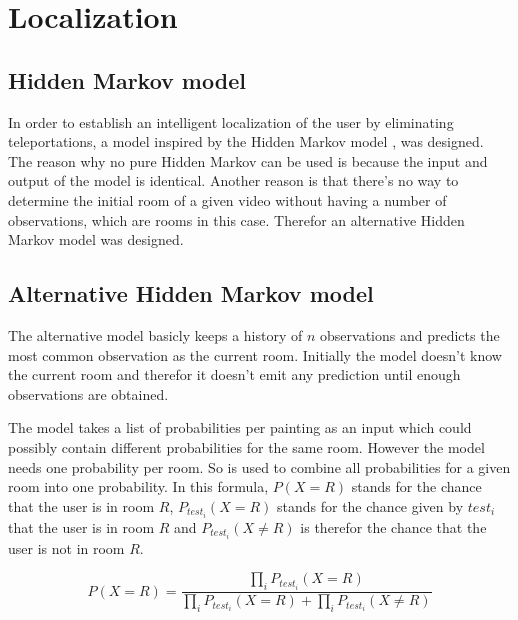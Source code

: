 \section{Localization}
\label{sec:localization}

\subsection{Hidden Markov model}
\label{subsec:hidden-markov}

In order to establish an intelligent localization of the user by eliminating teleportations, a model inspired by the Hidden Markov model \cite{eddy1996hidden}, was designed. The reason why no pure Hidden Markov can be used is because the input and output of the model is identical. Another reason is that there's no way to determine the initial room of a given video without having a number of observations, which are rooms in this case. Therefor an alternative Hidden Markov model was designed.


\subsection{Alternative Hidden Markov model}
\label{subsec:alternative-hidden-markov}

The alternative model basicly keeps a history of $n$ observations and predicts the most common observation as the current room. Initially the model doesn't know the current room and therefor it doesn't emit any prediction until enough observations are obtained.

The model takes a list of probabilities per painting as an input which could possibly contain different probabilities for the same room. However the model needs one probability per room. So  \cite{genest1986combining} is used to combine all probabilities for a given room into one probability. In this formula, $P(X = R)$ stands for the chance that the user is in room $R$, $P_{test_i}(X = R)$ stands for the chance given by $test_i$ that the user is in room $R$ and $P_{test_i}(X \ne R)$ is therefor the chance that the user is not in room $R$.

\begin{equation}
    \label{eq:combine-chances}
    P(X = R) = \frac{\prod_{i} P_{test_i}(X = R)}{\prod_{i} P_{test_i}(X = R) + \prod_{i} P_{test_i}(X \ne R)}
\end{equation}

